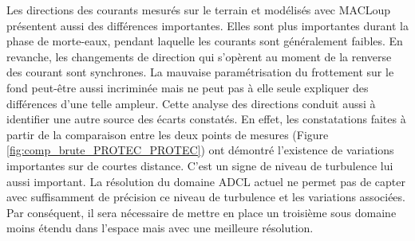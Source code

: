 \documentclass[10pt,a4paper,titlepage]{article}
\begin{document}

Les directions des courants mesurés sur le terrain et modélisés avec MACLoup présentent aussi des différences importantes.
Elles sont plus importantes durant la phase de morte-eaux, pendant laquelle les courants sont généralement faibles.
En revanche, les changements de direction qui s'opèrent au moment de la renverse des courant sont synchrones.
La mauvaise paramétrisation du frottement sur le fond peut-être aussi incriminée mais ne peut pas à elle seule expliquer des différences d'une telle ampleur.%
Cette analyse des directions conduit aussi à identifier une autre source des écarts constatés.
En effet, les constatations faites à partir de la comparaison entre les deux points de mesures (Figure \ref{fig:comp_brute_PROTEC_PROTEC}) ont démontré l'existence de variations importantes sur de courtes distance.
C'est un signe de niveau de turbulence lui aussi important.
La résolution du domaine ADCL actuel ne permet pas de capter avec suffisamment de précision ce niveau de turbulence et les variations associées.
Par conséquent, il sera nécessaire de mettre en place un troisième sous domaine moins étendu dans l'espace mais avec une meilleure résolution.
\end{document}
